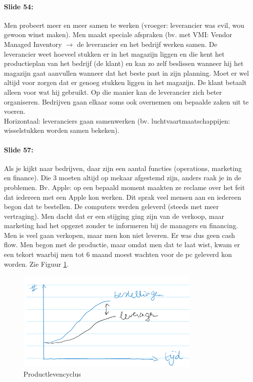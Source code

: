 \documentclass[10pt,a4paper]{report}
\begin{document}
\paragraph{Slide 54:} Men probeert meer en meer samen te werken (vroeger: leverancier was evil, wou gewoon winst maken). Men maakt speciale afspraken (bv. met VMI: Vendor Managed Inventory $\rightarrow$ de leverancier en het bedrijf werken samen. De leverancier weet hoeveel stukken er in het magazijn liggen en die kent het productieplan van het bedrijf (de klant) en kan zo zelf beslissen wanneer hij het magazijn gaat aanvullen wanneer dat het beste past in zijn planning. Moet er wel altijd voor zorgen dat er genoeg stukken liggen in het magazijn. De klant betaalt alleen voor wat hij gebruikt. Op die manier kan de leverancier zich beter organiseren. Bedrijven gaan elkaar soms ook overnemen om bepaalde zaken uit te voeren.\\
Horizontaal: leveranciers gaan samenwerken (bv. luchtvaartmaatschappijen: wisselstukken worden samen bekeken).

\paragraph{Slide 57:} Als je kijkt naar bedrijven, daar zijn een aantal functies (operations, marketing en finance). Die 3 moeten altijd op mekaar afgestemd zijn, anders raak je in de problemen. Bv. Apple: op een bepaald moment maakten ze reclame over het feit dat iedereen met een Apple kon werken. Dit sprak veel mensen aan en iedereen begon dat te bestellen. De computers werden geleverd (steeds met meer vertraging). Men dacht dat er een stijging ging zijn van de verkoop, maar marketing had het opgezet zonder te informeren bij de managers en financing. Men is veel gaan verkopen, maar men kon niet leveren. Er was dus geen cash flow. Men begon met de productie, maar omdat men dat te laat wist, kwam er een tekort waarbij men tot 6 maand moest wachten voor de pc geleverd kon worden. Zie Figuur \ref{les02_01}.


\begin{figure}[h!]
\centering
\includegraphics[width=90mm]{Les02_01.png}
\caption{Productlevencyclus} 
\label{les02_01}
\end{figure}
\end{document}

